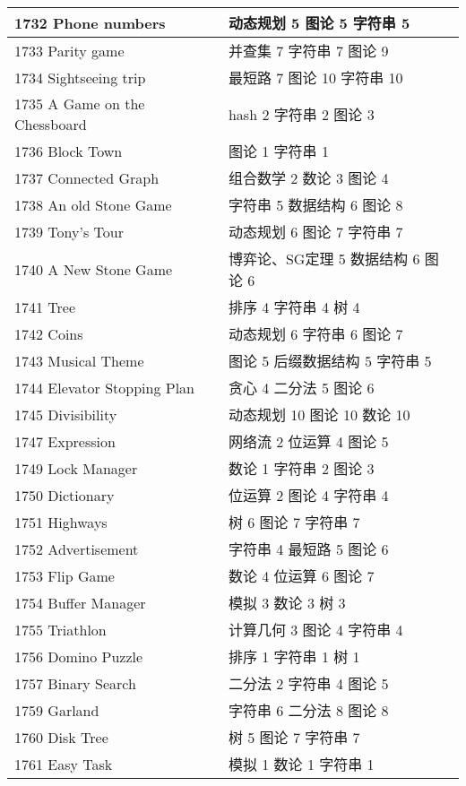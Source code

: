 \begin{longtable}{| p{} | p{} |}
 1732 Phone numbers  & 动态规划 5 图论 5 字符串 5 \\ \hline
 1733 Parity game  & 并查集 7 字符串 7 图论 9 \\ \hline
 1734 Sightseeing trip  & 最短路 7 图论 10 字符串 10 \\ \hline
 1735 A Game on the Chessboard  & hash 2 字符串 2 图论 3 \\ \hline
 1736 Block Town  & 图论 1 字符串 1 \\ \hline
 1737 Connected Graph  & 组合数学 2 数论 3 图论 4 \\ \hline
 1738 An old Stone Game  & 字符串 5 数据结构 6 图论 8 \\ \hline
 1739 Tony's Tour  & 动态规划 6 图论 7 字符串 7 \\ \hline
 1740 A New Stone Game  & 博弈论、SG定理 5 数据结构 6 图论 6 \\ \hline
 1741 Tree  & 排序 4 字符串 4 树 4 \\ \hline
 1742 Coins  & 动态规划 6 字符串 6 图论 7 \\ \hline
 1743 Musical Theme  & 图论 5 后缀数据结构 5 字符串 5 \\ \hline
 1744 Elevator Stopping Plan  & 贪心 4 二分法 5 图论 6 \\ \hline
 1745 Divisibility  & 动态规划 10 图论 10 数论 10 \\ \hline
 1747 Expression  & 网络流 2 位运算 4 图论 5 \\ \hline
 1749 Lock Manager  & 数论 1 字符串 2 图论 3 \\ \hline
 1750 Dictionary  & 位运算 2 图论 4 字符串 4 \\ \hline
 1751 Highways  & 树 6 图论 7 字符串 7 \\ \hline
 1752 Advertisement  & 字符串 4 最短路 5 图论 6 \\ \hline
 1753 Flip Game  & 数论 4 位运算 6 图论 7 \\ \hline
 1754 Buffer Manager  & 模拟 3 数论 3 树 3 \\ \hline
 1755 Triathlon  & 计算几何 3 图论 4 字符串 4 \\ \hline
 1756 Domino Puzzle  & 排序 1 字符串 1 树 1 \\ \hline
 1757 Binary Search  & 二分法 2 字符串 4 图论 5 \\ \hline
 1759 Garland  & 字符串 6 二分法 8 图论 8 \\ \hline
 1760 Disk Tree  & 树 5 图论 7 字符串 7 \\ \hline
 1761 Easy Task  & 模拟 1 数论 1 字符串 1 \\ \hline

\end{longtable}
